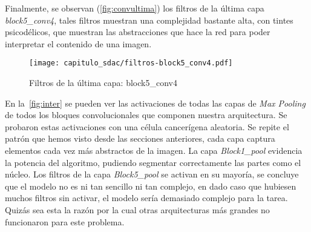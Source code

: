 Finalmente, se observan (\autoref{fig:convultima}) los filtros de la última capa
\emph{block5\_conv4}, tales filtros muestran una complejidad bastante alta, con
tintes psicodélicos, que muestran las abstracciones que hace la red para poder
interpretar el contenido de una imagen.

\begin{figure}[] 
  \centering
  \texttt{[image: capitulo\_sdac/filtros-block5\_conv4.pdf]}
  \caption{Filtros de la última capa: block5\_conv4}\label{fig:convultima}
\end{figure}

En la~\autoref{fig:inter} se pueden ver las activaciones de todas las capas de
\emph{Max Pooling} de todos los bloques convolucionales que componen nuestra
arquitectura. Se probaron estas activaciones con una célula cancerígena
aleatoria. Se repite el patrón que hemos visto desde las secciones anteriores,
cada capa captura elementos cada vez más abstractos de la imagen. La capa
\emph{Block1\_pool} evidencia la potencia del algoritmo, pudiendo segmentar
correctamente las partes como el núcleo. Los filtros de la capa
\emph{Block5\_pool} se activan en su mayoría, se concluye que el modelo no es ni
tan sencillo ni tan complejo, en dado caso que hubiesen muchos filtros sin
activar, el modelo sería demasiado complejo para la tarea. Quizás sea esta la
razón por la cual otras arquitecturas más grandes no funcionaron para este
problema.

